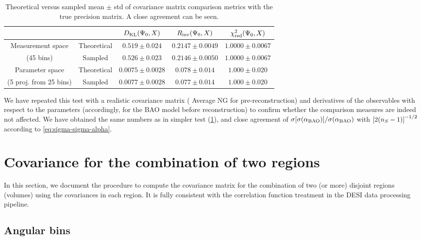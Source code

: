 \begin{table}
\begin{tabular}{|c|c|c|c|c|}
\hline
 & & $D_{\rm KL}(\Psi_0, X)$ & $R_{\rm inv}(\Psi_0, X)$ & $\chi^2_{\rm red}(\Psi_0, X)$ \\
\hline
Measurement space & Theoretical & $0.519 \pm 0.024$ & $0.2147 \pm 0.0049$ & $1.0000 \pm 0.0067$ \\
(45 bins) & Sampled & $0.526 \pm 0.023$ & $0.2146 \pm 0.0050$ & $1.0000 \pm 0.0067$ \\
\hline
Parameter space & Theoretical & $0.0075 \pm 0.0028$ & $0.078 \pm 0.014$ & $1.000 \pm 0.020$ \\
(5 proj. from 25 bins) & Sampled & $0.0077 \pm 0.0028$ & $0.077 \pm 0.014$ & $1.000 \pm 0.020$ \\
\hline
\end{tabular}
\caption[Theoretical and empirical statistical properties of covariance matrix comparison metrics]{Theoretical versus sampled mean $\pm$ std of covariance matrix comparison metrics with the true precision matrix. A close agreement can be seen.}
\label{tab:stats-validation}
\end{table}

We have repeated this test with a realistic covariance matrix (\rascalc{} Average NG for pre-reconstruction) and derivatives of the observables with respect to the parameters (accordingly, for the BAO model before reconstruction) to confirm whether the comparison measures are indeed not affected.
We have obtained the same numbers as in simpler test (\cref{tab:stats-validation}), and close agreement of $\sigma{\left[ \sigma(\alpha_{\rm BAO}) \right]}/\sigma(\alpha_{\rm BAO})$ with ${\left[ 2(n_S-1) \right]}^{-1/2}$ according to \cref{eq:sigma-sigma-alpha}.

\section{Covariance for the combination of two regions}
\label{sec:cov-comb}

In this section, we document the procedure to compute the covariance matrix for the combination of two (or more) disjoint regions (volumes) using the covariances in each region.
It is fully consistent with the correlation function treatment in the DESI data processing pipeline.

\subsection{Angular bins}

